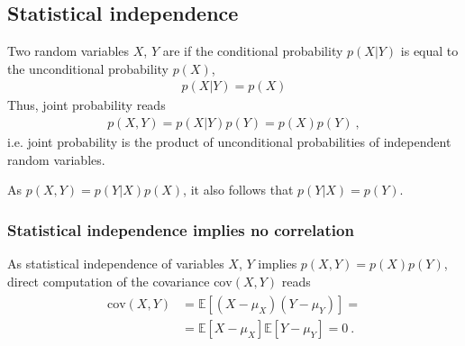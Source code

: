 \documentclass[letterpaper,10pt,english]{jupyterBook}
\begin{document}
\subsection{Statistical independence}
\label{\detokenize{code/notebooks/correlation_vs_causation:statistical-independence}}
\sphinxAtStartPar
Two random variables \(X\), \(Y\) are  if the conditional probability \(p(X|Y)\) is equal to the unconditional probability \(p(X)\),
\begin{equation*}
\begin{split}p(X|Y) = p(X)\end{split}
\end{equation*}
\sphinxAtStartPar
Thus, joint probability reads
\begin{equation*}
\begin{split}p(X,Y) = p(X|Y) p(Y) = p(X) p(Y) \ , \end{split}
\end{equation*}
\sphinxAtStartPar
i.e. joint probability is the product of unconditional probabilities of independent random variables.

\sphinxAtStartPar
As \(p(X,Y) = p(Y|X) p(X)\), it also follows that \(p(Y|X) = p(Y)\).


\subsubsection{Statistical independence implies no correlation}
\label{\detokenize{code/notebooks/correlation_vs_causation:statistical-independence-implies-no-correlation}}
\sphinxAtStartPar
As statistical independence  of variables \(X\), \(Y\) implies \(p(X,Y) = p(X) p(Y)\), direct computation of the covariance \(\text{cov}(X,Y)\) reads
\begin{equation*}
\begin{split}\begin{aligned}
  \text{cov}(X,Y)
  & = \mathbb{E}\left[ \left( X - \mu_X \right) \left( Y - \mu_Y \right) \right] = \\
  & = \mathbb{E}\left[ X - \mu_X \right] \mathbb{E} \left[ Y - \mu_Y \right] = 0 \ .
\end{aligned}\end{split}
\end{equation*}
\end{document}
